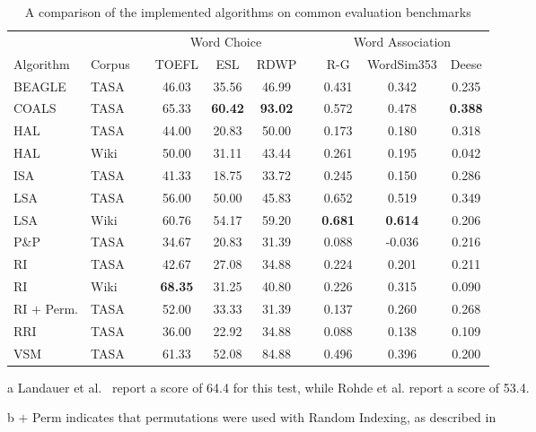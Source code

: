 \begin{table}[htb]
  \center
  \begin{threeparttable}
    \begin{tabular}{l l r ccc r ccc }
      \toprule
      & & &  \multicolumn{3}{c}{Word Choice} & &
      \multicolumn{3}{c}{Word Association} \\
      \cmidrule{4-6} \cmidrule{8-10}
      Algorithm & Corpus && TOEFL & ESL    & RDWP & & R-G    & WordSim353 & Deese \\
      \midrule
      \midrule
      BEAGLE    & TASA  &&  46.03  &  35.56  &  46.99  &&  0.431  &  0.342 & 0.235 \\
      COALS & TASA  &&  65.33  &  \textbf{60.42}  &  \textbf{93.02}  &&  0.572  &  0.478 & \textbf{0.388} \\
      HAL       & TASA  &&  44.00  &  20.83  &  50.00  &&  0.173  &  0.180 & 0.318 \\
      HAL       & Wiki  &&  50.00  &  31.11  &  43.44  &&  0.261  &  0.195 & 0.042 \\
      ISA       & TASA  &&  41.33  &  18.75  &  33.72  &&  0.245  &  0.150 & 0.286 \\
      LSA       & TASA  &&  56.00\tnote{a}  &  50.00  &  45.83  &&  0.652  &  0.519 & 0.349 \\
      LSA       & Wiki  &&  60.76  &  54.17  &  59.20  &&  \textbf{0.681}  &  \textbf{0.614} & 0.206 \\
      P\&P      & TASA  &&  34.67  &  20.83  &  31.39  &&  0.088  & -0.036 & 0.216 \\
      RI        & TASA  &&  42.67  &  27.08  &  34.88  &&  0.224  &  0.201 & 0.211 \\
      RI        & Wiki    &&  \textbf{68.35}  &  31.25  &  40.80  &&  0.226  &  0.315 & 0.090 \\
      RI $+$ Perm.\tnote{b}& TASA  &&  52.00  &  33.33  &  31.39  &&  0.137  &  0.260 & 0.268 \\
      RRI       & TASA  &&  36.00  &  22.92  &  34.88  &&  0.088  &  0.138 & 0.109 \\
      VSM       & TASA  &&  61.33  &  52.08  &  84.88  &&  0.496  &  0.396 & 0.200 \\
      \bottomrule
    \end{tabular}
    \begin{tablenotes}
    \item[a] {\footnotesize Landauer et al.\ 
      report a score of 64.4 for this test, while Rohde et
      al.  report a score of 53.4.}
    \item[b] {\footnotesize $+$ Perm indicates that permutations were used with
      Random Indexing, as described in \cite{sahlgren08permutations}}
    \end{tablenotes}
  \end{threeparttable}
  \caption{A comparison of the implemented algorithms on common evaluation
    benchmarks}
  \label{tab:evaluation}
\end{table}


